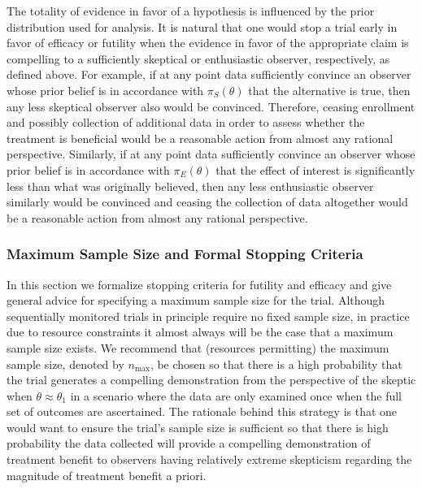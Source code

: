 \documentclass[12pt]{article}
\begin{document}
The totality of evidence in favor of a hypothesis is influenced by 
the prior distribution used for analysis.
%
It is natural that one would stop a trial early in favor of efficacy or futility when the evidence in favor of the appropriate claim is compelling
to a sufficiently skeptical or enthusiastic observer, respectively, as defined above.
%
For example, if at any point data sufficiently convince an observer whose prior belief is in accordance with $\pi_{S}(\theta)$ that 
the alternative is true, then any less skeptical observer also would be convinced. Therefore, ceasing enrollment and possibly collection 
of additional data in order to assess whether the treatment is beneficial would be a reasonable action from almost any rational perspective.
%
Similarly, if at any point data sufficiently convince an observer whose prior belief is in accordance with $\pi_{E}(\theta)$ that 
the effect of interest is significantly less than what was originally believed, then any less enthusiastic observer similarly would be convinced and ceasing the collection of data altogether would be a reasonable action from almost any rational perspective.

\subsubsection{Maximum Sample Size and Formal Stopping Criteria}
In this section we formalize stopping criteria for futility and efficacy and give general 
advice for specifying a maximum sample size for the trial.
%
Although sequentially monitored trials in principle require no fixed sample size, in practice due to resource 
constraints it almost always will be the case that a maximum sample size exists. 
%
We recommend that (resources permitting) the maximum sample size, denoted by $n_{\text{max}}$, be chosen so that there is a 
high probability that the trial generates a compelling demonstration from the perspective of the skeptic when $\theta \approx \theta_1$ in a scenario where the data are only examined once when the full set of 
outcomes are ascertained.
%
The rationale behind this strategy is that one would want to ensure the trial's sample size is sufficient so that
there is high probability the data collected will provide a compelling demonstration of treatment benefit to observers 
having relatively extreme skepticism regarding the magnitude of treatment benefit a priori.  
\end{document}
